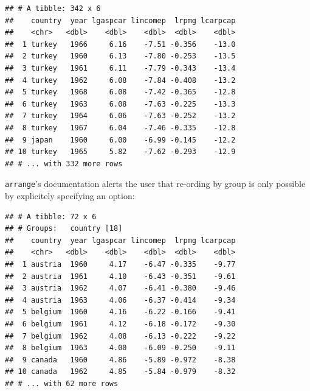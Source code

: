 \documentclass[]{gitbook}
\newenvironment{Shaded}{\begin{snugshade}}{\end{snugshade}}
\newcommand{\DataTypeTok}[1]{\textcolor[rgb]{0.13,0.29,0.53}{#1}}
\newcommand{\DecValTok}[1]{\textcolor[rgb]{0.00,0.00,0.81}{#1}}
\newcommand{\KeywordTok}[1]{\textcolor[rgb]{0.13,0.29,0.53}{\textbf{#1}}}
\newcommand{\NormalTok}[1]{#1}
\newcommand{\OperatorTok}[1]{\textcolor[rgb]{0.81,0.36,0.00}{\textbf{#1}}}
\newcommand{\OtherTok}[1]{\textcolor[rgb]{0.56,0.35,0.01}{#1}}
\newcommand{\StringTok}[1]{\textcolor[rgb]{0.31,0.60,0.02}{#1}}
\theoremstyle{definition}
\theoremstyle{definition}
\theoremstyle{definition}
\theoremstyle{remark}
\begin{document}
\begin{Shaded}
\end{Shaded}

\begin{verbatim}
## # A tibble: 342 x 6
##    country  year lgaspcar lincomep  lrpmg lcarpcap
##    <chr>   <dbl>    <dbl>    <dbl>  <dbl>    <dbl>
##  1 turkey   1966     6.16    -7.51 -0.356    -13.0
##  2 turkey   1960     6.13    -7.80 -0.253    -13.5
##  3 turkey   1961     6.11    -7.79 -0.343    -13.4
##  4 turkey   1962     6.08    -7.84 -0.408    -13.2
##  5 turkey   1968     6.08    -7.42 -0.365    -12.8
##  6 turkey   1963     6.08    -7.63 -0.225    -13.3
##  7 turkey   1964     6.06    -7.63 -0.252    -13.2
##  8 turkey   1967     6.04    -7.46 -0.335    -12.8
##  9 japan    1960     6.00    -6.99 -0.145    -12.2
## 10 turkey   1965     5.82    -7.62 -0.293    -12.9
## # ... with 332 more rows
\end{verbatim}

\texttt{arrange}'s documentation alerts the user that re-ording by group
is only possible by explicitely specifying an option:

\begin{Shaded}
\end{Shaded}

\begin{verbatim}
## # A tibble: 72 x 6
## # Groups:   country [18]
##    country  year lgaspcar lincomep  lrpmg lcarpcap
##    <chr>   <dbl>    <dbl>    <dbl>  <dbl>    <dbl>
##  1 austria  1960     4.17    -6.47 -0.335    -9.77
##  2 austria  1961     4.10    -6.43 -0.351    -9.61
##  3 austria  1962     4.07    -6.41 -0.380    -9.46
##  4 austria  1963     4.06    -6.37 -0.414    -9.34
##  5 belgium  1960     4.16    -6.22 -0.166    -9.41
##  6 belgium  1961     4.12    -6.18 -0.172    -9.30
##  7 belgium  1962     4.08    -6.13 -0.222    -9.22
##  8 belgium  1963     4.00    -6.09 -0.250    -9.11
##  9 canada   1960     4.86    -5.89 -0.972    -8.38
## 10 canada   1962     4.85    -5.84 -0.979    -8.32
## # ... with 62 more rows
\end{verbatim}
\end{document}
